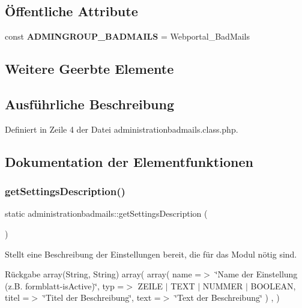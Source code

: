 \subsection*{Öffentliche Attribute}
\begin{DoxyCompactItemize}
\item 
\mbox{\label{classadministrationbadmails_a3d5f959909033f3e00d2a1cbfd750244}} 
const {\bfseries A\+D\+M\+I\+N\+G\+R\+O\+U\+P\+\_\+\+B\+A\+D\+M\+A\+I\+LS} = \textquotesingle{}Webportal\+\_\+\+Bad\+Mails\textquotesingle{}
\end{DoxyCompactItemize}
\subsection*{Weitere Geerbte Elemente}


\subsection{Ausführliche Beschreibung}


Definiert in Zeile 4 der Datei administrationbadmails.\+class.\+php.



\subsection{Dokumentation der Elementfunktionen}
\mbox{\label{classadministrationbadmails_ad6a56693cc31d7d4e887cdec1f0c8fa5}} 
\subsubsection{\texorpdfstring{get\+Settings\+Description()}{getSettingsDescription()}}
{\footnotesize\ttfamily static administrationbadmails\+::get\+Settings\+Description (\begin{DoxyParamCaption}{ }\end{DoxyParamCaption})\hspace{0.3cm}{\ttfamily [static]}}

Stellt eine Beschreibung der Einstellungen bereit, die für das Modul nötig sind. \begin{DoxyReturn}{Rückgabe}
array(\+String, String) array( array( \textquotesingle{}name\textquotesingle{} =$>$ \char`\"{}\+Name der Einstellung (z.\+B. formblatt-\/is\+Active)\char`\"{}, \textquotesingle{}typ\textquotesingle{} =$>$ Z\+E\+I\+LE $\vert$ T\+E\+XT $\vert$ N\+U\+M\+M\+ER $\vert$ B\+O\+O\+L\+E\+AN, \textquotesingle{}titel\textquotesingle{} =$>$ \char`\"{}\+Titel der Beschreibung\char`\"{}, \textquotesingle{}text\textquotesingle{} =$>$ \char`\"{}\+Text der Beschreibung\char`\"{} ) , ) 
\end{DoxyReturn}


